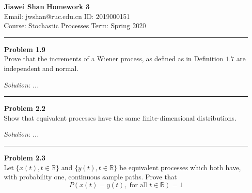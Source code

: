 \documentclass[a4paper, 11pt]{article}
\newenvironment{problem}[2][Problem]
    { \begin{mdframed}[backgroundcolor=gray!20] \textbf{#1 #2} \\}
    {  \end{mdframed}}
\newenvironment{solution}
    {\textit{Solution:}}
    {}
\begin{document}
\noindent
\large\textbf{Jiawei Shan} \hfill \textbf{Homework 3}   \\
Email: jwshan@ruc.edu.cn \hfill ID: 2019000151 \\
\normalsize Course: Stochastic Processes \hfill Term: Spring 2020\\
\noindent\rule{7in}{2.8pt}
\begin{problem}{1.9}

  Prove that the increments of a Wiener process, as defined as in Definition $1.7$ %
  are independent and normal.

\end{problem}

\begin{solution}
...
\end{solution}

\noindent\rule{7in}{2.8pt}
\begin{problem}{2.2}

  Show that equivalent processes have the same finite-dimensional distributions.

\end{problem}

\begin{solution}
...
\end{solution}

\noindent\rule{7in}{2.8pt}
\begin{problem}{2.3}

 Let $\{x(t), t \in \mathbb{R}\}$ and $\{y(t), t \in \mathbb{R}\}$ be equivalent processes which both have, with probability one, continuous sample paths. Prove that
$$
P\left(x(t)=y(t), \text { for all } t \in \mathbb{R}\right)=1
$$

\end{problem}
\end{document}
